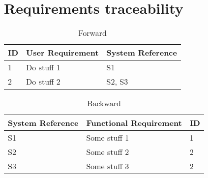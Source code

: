\documentclass[Main]{subfiles}
\begin{document}
\chapter{Requirements traceability}

\begin{table}[htbp]
	\centering
	\begin{tabular}{l l l} \hline
	ID & User Requirement & System Reference \\\hline
	1 & Do stuff 1 & S1 \\
	2 & Do stuff 2 & S2, S3 \\\hline
	\end{tabular}

\caption{Forward}
\label{Tab:Forward}
\end{table}


\begin{table}[htbp]
	\centering
	\begin{tabular}{l l l} \hline
	System Reference & Functional Requirement & ID\\\hline
	S1 & Some stuff 1 & 1 \\
	S2 & Some stuff 2 & 2 \\ 
	S3 & Some stuff 3 & 2\\\hline
	\end{tabular}

\caption{Backward}
\label{Tab:Backward}
\end{table}
\end{document}
